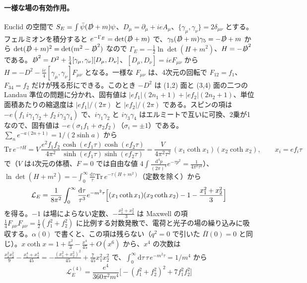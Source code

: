 \documentclass[a4paper,10pt]{ltjsarticle}
\newcommand{\dd}{\mathrm{d}}
\begin{document}
\paragraph{一様な場の有効作用。}Euclid の空間で $S_E=\int\bar\psi(\slashed D+m)\psi$、$D_\mu=\partial_\mu+ieA_\mu$、$\{\gamma_\mu,\gamma_\nu\}=2\delta_{\mu\nu}$ とする。フェルミオンを積分すると $e^{-\Gamma_E}=\det(\slashed D+m)$ で、$\gamma_5(\slashed D+m)\gamma_5=-\slashed D+m$ から $\det(\slashed D+m)^2=\det(m^2-\slashed D^2)$ なので $\Gamma_E=-\frac12\ln\det(H+m^2)$、$H=-\slashed D^2$ である。$\slashed D^2=D^2+\frac14[\gamma_\mu,\gamma_\nu][D_\mu,D_\nu]$、$[D_\mu,D_\nu]=ieF_{\mu\nu}$ から $H=-D^2-\frac{ie}{4}[\gamma_\mu,\gamma_\nu]F_{\mu\nu}$ となる。一様な $F_{\mu\nu}$ は、4次元の回転で $F_{12}=f_1$、$F_{34}=f_2$ だけが残る形にできる。このとき $-D^2$ は (1,2) 面と (3,4) 面の二つの Landau 準位の問題に分かれ、固有値は $|ef_1|(2n_1+1)+|ef_2|(2n_2+1)$、単位面積あたりの縮退度は $|ef_1|/(2\pi)$ と $|ef_2|/(2\pi)$ である。スピンの項は $-e(f_1\,i\gamma_1\gamma_2+f_2\,i\gamma_3\gamma_4)$ で、$i\gamma_1\gamma_2$ と $i\gamma_3\gamma_4$ はエルミートで互いに可換、2乗が1なので、固有値は $-e(\sigma_1f_1+\sigma_2f_2)$（$\sigma_i=\pm1$）である。$\sum_ne^{-a(2n+1)}=1/(2\sinh a)$ から
\begin{equation*}
\mathrm{Tr}\,e^{-\tau H}=V\,\frac{e^2f_1f_2}{4\pi^2}\frac{\cosh(ef_1\tau)\cosh(ef_2\tau)}{\sinh(ef_1\tau)\sinh(ef_2\tau)}=\frac{V}{4\pi^2\tau^2}\,(x_1\coth x_1)(x_2\coth x_2),\qquad x_i=ef_i\tau
\end{equation*}
で（$V$ は4次元の体積、$F=0$ では自由な値 $4\int\frac{\dd^4p}{(2\pi)^4}e^{-\tau p^2}=\frac{1}{4\pi^2\tau^2}$）、$\ln\det(H+m^2)=-\int_0^\infty\frac{\dd\tau}{\tau}\mathrm{Tr}\,e^{-\tau(H+m^2)}$（定数を除く）から
\begin{equation*}
\mathcal L_E=\frac{1}{8\pi^2}\int_0^\infty\frac{\dd\tau}{\tau^3}e^{-m^2\tau}\Bigl[(x_1\coth x_1)(x_2\coth x_2)-1-\frac{x_1^2+x_2^2}{3}\Bigr]
\end{equation*}
を得る。$-1$ は場によらない定数、$-\frac{x_1^2+x_2^2}{3}$ は Maxwell の項 $\frac14F_{\mu\nu}F_{\mu\nu}=\frac12(f_1^2+f_2^2)$ に比例する対数発散で、電荷と光子の場の繰り込みに吸収する。$\alpha(0)$ で書くと、この項は残らない（$q^2=0$ で引いた $\bar\Pi(0)=0$ と同じ）。$x\coth x=1+\frac{x^2}{3}-\frac{x^4}{45}+O(x^6)$ から、$x^4$ の次数は $\frac{x_1^2x_2^2}{9}-\frac{x_1^4+x_2^4}{45}=-\frac{(x_1^2+x_2^2)^2}{45}+\frac{7}{45}x_1^2x_2^2$ で、$\int_0^\infty\dd\tau\,\tau\,e^{-m^2\tau}=1/m^4$ から
\begin{equation*}
\mathcal L_E^{(4)}=\frac{e^4}{360\pi^2m^4}\bigl[-(f_1^2+f_2^2)^2+7f_1^2f_2^2\bigr]
\end{equation*}
\end{document}

